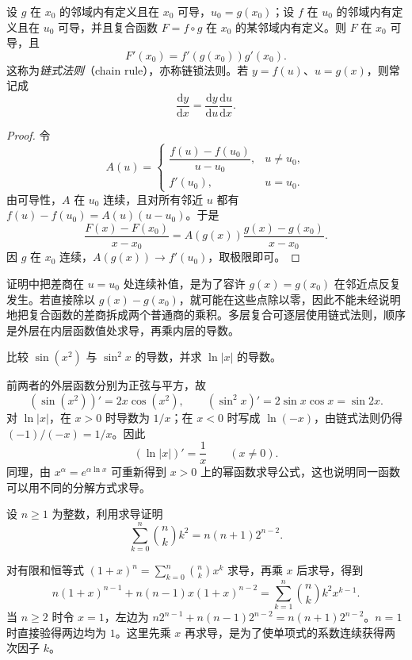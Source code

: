 \begin{theorem}[链式法则]
\label{thm:one-variable-chain-rule}
设 $g$ 在 $x_0$ 的邻域内有定义且在 $x_0$ 可导，$u_0=g(x_0)$；设 $f$ 在 $u_0$ 的邻域内有定义且在 $u_0$ 可导，并且复合函数 $F=f\circ g$ 在 $x_0$ 的某邻域内有定义。则 $F$ 在 $x_0$ 可导，且
\begin{equation}
\label{eq:one-variable-chain-rule}
    F'(x_0)=f'(g(x_0))g'(x_0).
\end{equation}
这称为\emph{链式法则}（chain rule），亦称链锁法则。若 $y=f(u)$、$u=g(x)$，则常记成
\[
    \frac{\mathrm dy}{\mathrm dx}
    =\frac{\mathrm dy}{\mathrm du}\frac{\mathrm du}{\mathrm dx}.
\]
\end{theorem}
\begin{proof}
令
\[
    A(u)=\begin{cases}
        \dfrac{f(u)-f(u_0)}{u-u_0},&u\ne u_0,\\[4pt]
        f'(u_0),&u=u_0.
    \end{cases}
\]
由可导性，$A$ 在 $u_0$ 连续，且对所有邻近 $u$ 都有 $f(u)-f(u_0)=A(u)(u-u_0)$。于是
\[
    \frac{F(x)-F(x_0)}{x-x_0}
    =A(g(x))\frac{g(x)-g(x_0)}{x-x_0}.
\]
因 $g$ 在 $x_0$ 连续，$A(g(x))\to f'(u_0)$，取极限即可。
\end{proof}

证明中把差商在 $u=u_0$ 处连续补值，是为了容许 $g(x)=g(x_0)$ 在邻近点反复发生。若直接除以 $g(x)-g(x_0)$，就可能在这些点除以零，因此不能未经说明地把复合函数的差商拆成两个普通商的乘积。多层复合可逐层使用链式法则，顺序是外层在内层函数值处求导，再乘内层的导数。

\begin{example}
\label{ex:chain-rule-and-logarithm-derivatives}
比较 $\sin(x^2)$ 与 $\sin^2x$ 的导数，并求 $\ln|x|$ 的导数。
\end{example}
\begin{solve}
前两者的外层函数分别为正弦与平方，故
\[
    (\sin(x^2))'=2x\cos(x^2),\qquad
    (\sin^2x)'=2\sin x\cos x=\sin2x.
\]
对 $\ln|x|$，在 $x>0$ 时导数为 $1/x$；在 $x<0$ 时写成 $\ln(-x)$，由链式法则仍得 $(-1)/(-x)=1/x$。因此
\[
    (\ln|x|)'=\frac1x\qquad(x\ne0).
\]
同理，由 $x^\alpha=e^{\alpha\ln x}$ 可重新得到 $x>0$ 上的幂函数求导公式，这也说明同一函数可以用不同的分解方式求导。
\end{solve}

\begin{example}
\label{ex:binomial-square-sum-by-differentiation}
设 $n\geq1$ 为整数，利用求导证明
\[
    \sum_{k=0}^n\binom nk k^2=n(n+1)2^{n-2}.
\]
\end{example}
\begin{solve}
对有限和恒等式 $(1+x)^n=\sum_{k=0}^n\binom nk x^k$ 求导，再乘 $x$ 后求导，得到
\[
    n(1+x)^{n-1}+n(n-1)x(1+x)^{n-2}
    =\sum_{k=1}^n\binom nk k^2x^{k-1}.
\]
当 $n\geq2$ 时令 $x=1$，左边为 $n2^{n-1}+n(n-1)2^{n-2}=n(n+1)2^{n-2}$。$n=1$ 时直接验得两边均为 $1$。这里先乘 $x$ 再求导，是为了使单项式的系数连续获得两次因子 $k$。
\end{solve}

